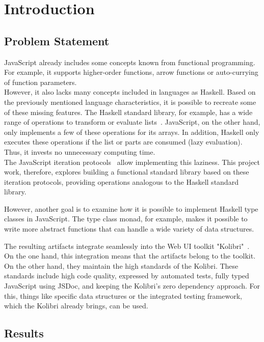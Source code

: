 \chapter{Introduction}
\label{chap:introduction}

\section*{Problem Statement} %
\label{sec:Problem Statement}
JavaScript already includes some concepts known from functional programming.
For example, it supports higher-order functions, arrow functions or
auto-currying of function parameters.\\
However, it also lacks many concepts included in languages as Haskell. Based on
the previously mentioned language characteristics, it is possible to recreate some of
these missing features. The Haskell standard library, for example, has a wide range of
operations to transform or evaluate lists~\cite{haskell_list}. JavaScript, on the other hand, only
implements a few of these operations for its arrays. In addition, Haskell only
executes these operations if the list or parts are consumed (lazy evaluation).
Thus, it invests no unnecessary computing time.\\
The JavaScript iteration protocols~\cite{mdn_protocols} allow implementing this laziness. This
project work, therefore, explores building a functional standard library based
on these iteration protocols, providing operations analogous to the Haskell
standard library.

However, another goal is to examine how it is possible to implement Haskell
type classes in JavaScript. The type class monad, for example, makes it
possible to write more abstract functions that can handle a wide variety of
data structures. 

The resulting artifacts integrate seamlessly into the Web UI toolkit
"Kolibri"~\cite{kolibri}. On the one hand, this integration means that the
artifacts belong to the toolkit. On the other hand, they maintain the high
standards of the Kolibri. These standards include high code quality, expressed
by automated tests, fully typed JavaScript using JSDoc, and keeping the
Kolibri's zero dependency approach. For this, things like specific data
structures or the integrated testing framework, which the Kolibri already
brings, can be used.

\section*{Results} %
\label{sec:Introduction_Results}

